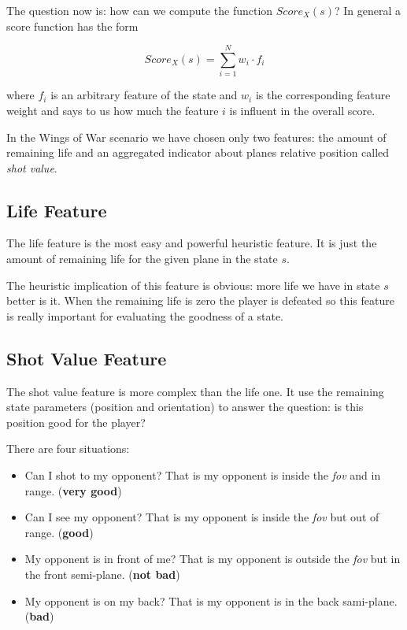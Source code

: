 The question now is: how can we compute the function $Score_X(s)$? In general a score
function has the form

\begin{equation}
  Score_X(s) = \sum_{i=1}^N w_i \cdot f_i
\end{equation}

where $f_i$ is an arbitrary feature of the state and $w_i$ is the corresponding feature
weight and says to us how much the feature $i$ is influent in the overall score.

In the Wings of War scenario we have chosen only two features: the amount of remaining
life and an aggregated indicator about planes relative position called \emph{shot value}.

\subsection{Life Feature}

The life feature is the most easy and powerful heuristic feature. It is just the amount of
remaining life for the given plane in the state $s$.

The heuristic implication of this feature is obvious: more life we have in state $s$
better is it. When the remaining life is zero the player is defeated so this feature is
really important for evaluating the goodness of a state.

\subsection{Shot Value Feature}

The shot value feature is more complex than the life one. It use the remaining state
parameters (position and orientation) to answer the question: is this position good for
the player?

There are four situations:

\begin{itemize}
  \item Can I shot to my opponent? That is my opponent is inside the \emph{fov} and
    in range. (\textbf{very good})
  \item Can I see my opponent? That is my opponent is inside the \emph{fov} but out of
    range. (\textbf{good})
  \item My opponent is in front of me? That is my opponent is outside the \emph{fov}
    but in the front semi-plane. (\textbf{not bad})
  \item My opponent is on my back? That is my opponent is in the back sami-plane.
    (\textbf{bad})
\end{itemize}

